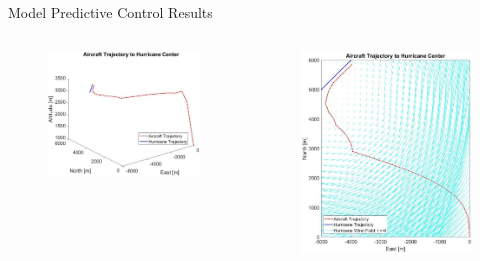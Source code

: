\documentclass[aspectratio=169]{beamer}
\begin{document}
\begin{frame}{Model Predictive Control Results}
    \begin{columns}
        \begin{column}{0.55\textwidth}
            \begin{figure}
                \centering
                \includegraphics[width=1\textwidth]{MPC_Disturbance_3D.jpg}
            \end{figure}
        \end{column}
        \begin{column}{0.45\textwidth}
            \begin{figure}
                \centering
                \includegraphics[width=1\textwidth]{MPC_Disturbance_2D.jpg}

\end{figure}
\end{column}
\end{columns}
\end{frame}
\end{document}
